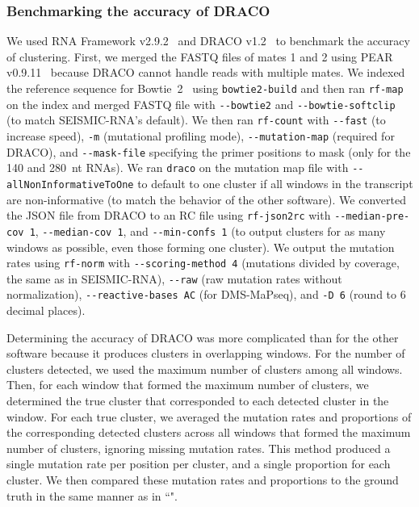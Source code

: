 \documentclass[11pt]{article}
\begin{document}
\subsubsection{Benchmarking the accuracy of DRACO}
\label{benchmark-accuracy-draco}

We used RNA Framework v2.9.2~\cite{Incarnato2018} and DRACO v1.2~\cite{Morandi2021} to benchmark the accuracy of clustering.
First, we merged the FASTQ files of mates 1 and 2 using PEAR v0.9.11~\cite{Zhang2013} because DRACO cannot handle reads with multiple mates.
We indexed the reference sequence for Bowtie~2~\cite{Langmead2012} using \verb|bowtie2-build| and then ran \verb|rf-map| on the index and merged FASTQ file with \verb|--bowtie2| and \verb|--bowtie-softclip| (to match SEISMIC-RNA's default).
We then ran \verb|rf-count| with \verb|--fast| (to increase speed), \verb|-m| (mutational profiling mode), \verb|--mutation-map| (required for DRACO), and \verb|--mask-file| specifying the primer positions to mask (only for the 140 and 280~nt RNAs).
We ran \verb|draco| on the mutation map file with \verb|--allNonInformativeToOne| to default to one cluster if all windows in the transcript are non-informative (to match the behavior of the other software).
We converted the JSON file from DRACO to an RC file using \verb|rf-json2rc| with \verb|--median-pre-cov 1|, \verb|--median-cov 1|, and \verb|--min-confs 1| (to output clusters for as many windows as possible, even those forming one cluster).
We output the mutation rates using \verb|rf-norm| with \verb|--scoring-method 4| (mutations divided by coverage, the same as in SEISMIC-RNA), \verb|--raw| (raw mutation rates without normalization), \verb|--reactive-bases AC| (for DMS-MaPseq), and \verb|-D 6| (round to 6 decimal places).

Determining the accuracy of DRACO was more complicated than for the other software because it produces clusters in overlapping windows.
For the number of clusters detected, we used the maximum number of clusters among all windows.
Then, for each window that formed the maximum number of clusters, we determined the true cluster that corresponded to each detected cluster in the window.
For each true cluster, we averaged the mutation rates and proportions of the corresponding detected clusters across all windows that formed the maximum number of clusters, ignoring missing mutation rates.
This method produced a single mutation rate per position per cluster, and a single proportion for each cluster.
We then compared these mutation rates and proportions to the ground truth in the same manner as in ``".
\end{document}
